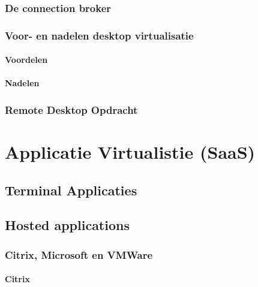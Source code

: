 \documentclass[a4paper,12pt,twoside,openright,titlepage]{book}
\begin{document}
\subsection{De connection broker}

\subsection{Voor- en nadelen desktop virtualisatie}
\subsubsection{Voordelen}

\subsubsection{Nadelen}

\subsection{Remote Desktop Opdracht}



\chapter{Applicatie Virtualistie (SaaS)}

\section{Terminal Applicaties}
\section{Hosted applications}
\subsection{Citrix, Microsoft en VMWare}
\subsubsection{Citrix}

\end{document}
